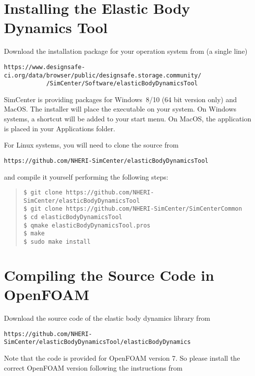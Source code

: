 \label{sec:EBD-installation}

\section{Installing the Elastic Body Dynamics Tool}

Download the installation package for your operation system from (a single line)

\begin{verbatim}
https://www.designsafe-ci.org/data/browser/public/designsafe.storage.community/
            /SimCenter/Software/elasticBodyDynamicsTool
\end{verbatim}

SimCenter is providing packages for Windows~8/10 (64 bit version only) and MacOS. The installer will place the executable on your system.  On Windows systems, a shortcut will be added to your start menu. On MacOS, the application is placed in your Applications folder.

\bigskip

For Linux systems, you will need to clone the source from 

\begin{verbatim}
https://github.com/NHERI-SimCenter/elasticBodyDynamicsTool
\end{verbatim}

and compile it yourself performing the following steps:

\begin{quote}
\begin{verbatim}
$ git clone https://github.com/NHERI-SimCenter/elasticBodyDynamicsTool
$ git clone https://github.com/NHERI-SimCenter/SimCenterCommon
$ cd elasticBodyDynamicsTool
$ qmake elasticBodyDynamicsTool.pros
$ make
$ sudo make install
\end{verbatim}
\end{quote}

\section{Compiling the Source Code in OpenFOAM}

Download the source code of the elastic body dynamics library from

\begin{verbatim}
https://github.com/NHERI-SimCenter/elasticBodyDynamicsTool/elasticBodyDynamics
\end{verbatim}

\noindent Note that the code is provided for OpenFOAM version 7. So please install the correct OpenFOAM version following the instructions from

